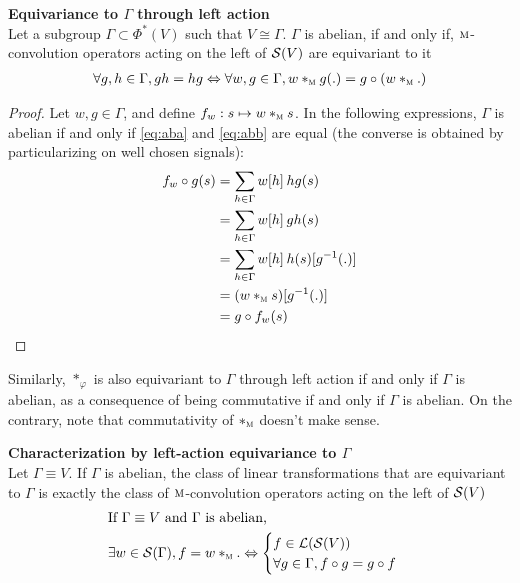 \begin{proposition}\textbf{Equivariance to $\Gamma$ through left action}\\
Let a subgroup $\Gamma \subset \Phi^*(V)$ such that $V \cong \Gamma$. $\Gamma$ is abelian, if and only if, $\M$-convolution operators acting on the left of $\cs(V)$ are equivariant to it \ie
\begin{gather*}
\forall g,h \in \Gamma, gh = hg \Leftrightarrow \forall w, g \in \Gamma, w \ast_{\M} g(.) = g \circ (w \ast_{\M} .) 
\end{gather*}
\end{proposition}

\begin{proof}
Let $w, g \in \Gamma$, and define $f_w: s \mapsto w \ast_{\M} s$. In the following expressions, $\Gamma$ is abelian if and only if \eqref{eq:aba} and \eqref{eq:abb} are equal (the converse is obtained by particularizing on well chosen signals):
\begin{align}
f_w \circ g (s) & = \displaystyle \sum_{h \in \Gamma} w[h] \h{2} hg(s) \label{eq:aba}\\
 & = \displaystyle \sum_{h \in \Gamma} w[h] \h{2} gh(s) \label{eq:abb}\\
 & = \displaystyle \sum_{h \in \Gamma} w[h] \h{2} h(s)[g^{-1}(.)] \nn\\
 & = (w \ast_{\M} s )[g^{-1}(.)] \nn\\
 & = g \circ f_w (s) \nn
\end{align}
\end{proof}

\begin{remark}Similarly, $\ast_{\varphi}$ is also equivariant to $\Gamma$ through left action if and only if $\Gamma$ is abelian, as a consequence of being commutative if and only if $\Gamma$ is abelian. On the contrary, note that commutativity of $\ast_{\M}$ doesn't make sense.
\end{remark}

\begin{corrolary}\textbf{Characterization by left-action equivariance to $\Gamma$}\\
Let $\Gamma \equiv V$. If $\Gamma$ is abelian, the class of linear transformations that are equivariant to $\Gamma$ is exactly the class of $\M$-convolution operators acting on the left of $\cs(V)$ \ie
\begin{align*}
& \text{If } \Gamma \equiv V \text{ and $\Gamma$ is abelian,}\\
& \exists w \in \cs(\Gamma), f = w \ast_{\M} . \Leftrightarrow
\begin{cases}
f \in \cl(\cs(V))\\
\forall g \in \Gamma, f \circ g = g \circ f
\end{cases}
\end{align*}
\end{corrolary}

